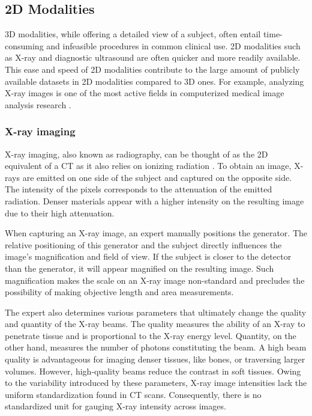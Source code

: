 \subsection{2D Modalities}

3D modalities, while offering a detailed view of a subject, often entail time-consuming and infeasible procedures in common clinical use. 2D modalities such as X-ray and diagnostic ultrasound are often quicker and more readily available. This ease and speed of 2D modalities contribute to the large amount of publicly available datasets in 2D modalities compared to 3D ones. For example, analyzing X-ray images is one of the most active fields in computerized medical image analysis research \cite{nguyen2020vindrcxr, irvinCheXpertLargeChest2019}.

\subsubsection{X-ray imaging}

X-ray imaging, also known as radiography, can be thought of as the 2D equivalent of a CT as it also relies on ionizing radiation \cite{seibertXrayImagingPhysics2004}. To obtain an image, X-rays are emitted on one side of the subject and captured on the opposite side. The intensity of the pixels corresponds to the attenuation of the emitted radiation. Denser materials appear with a higher intensity on the resulting image due to their high attenuation.

When capturing an X-ray image, an expert manually positions the generator. The relative positioning of this generator and the subject directly influences the image's magnification and field of view. If the subject is closer to the detector than the generator, it will appear magnified on the resulting image. Such magnification makes the scale on an X-ray image non-standard and precludes the possibility of making objective length and area measurements.

The expert also determines various parameters that ultimately change the quality and quantity of the X-ray beams. The quality measures the ability of an X-ray to penetrate tissue and is proportional to the X-ray energy level. Quantity, on the other hand, measures the number of photons constituting the beam. A high beam quality is advantageous for imaging denser tissues, like bones, or traversing larger volumes. However, high-quality beams reduce the contrast in soft tissues. Owing to the variability introduced by these parameters, X-ray image intensities lack the uniform standardization found in CT scans. Consequently, there is no standardized unit for gauging X-ray intensity across images.


